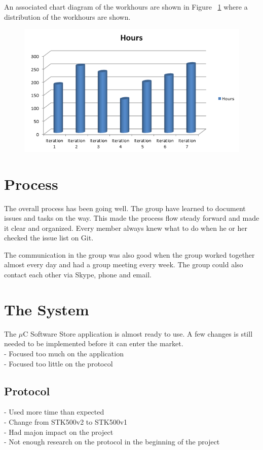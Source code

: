 	An associated chart diagram of the workhours are shown in Figure ~\ref{fig:workhours} where a distribution of the workhours are shown.

	\begin{figure}[H]
	\centering
	\label{fig:workhours}
	\includegraphics[scale=0.8]{images/workhours_chart2.png}
	\end{figure}

	\section{Process}
	The overall process has been going well. The group have learned to document issues and tasks on the way. This made the process flow steady forward and made it clear and organized. Every member always knew what to do when he or her checked the issue list on Git.

	The communication in the group was also good when the group worked together almost every day and had a group meeting every week. The group could also contact each other via Skype, phone and email.

	\section{The System}
	The $\mu$C Software Store application is almost ready to use. A few changes is still needed to be implemented before it can enter the market. \\

	- Focused too much on the application\\
	- Focused too little on the protocol

		\subsection{Protocol}
			- Used more time than expected\\
			- Change from STK500v2 to STK500v1\\
			- Had majon impact on the project\\
			- Not enough research on the protocol in the beginning of the project\\

